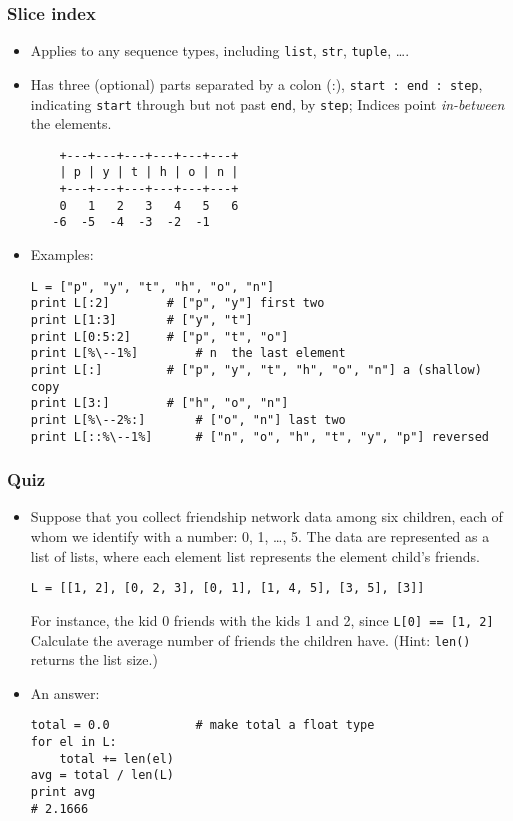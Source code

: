\documentclass{beamer}
\begin{document}
\begin{frame}[fragile]
\frametitle{Slice index}
\begin{itemize}
\item Applies to any sequence types, including
      \lstinline{list}, \lstinline{str},
      \lstinline{tuple}, \ldots.
\item Has three (optional) parts separated 
      by a colon (:),
      \lstinline{start : end : step}, indicating
      \lstinline{start} through but not past
      \lstinline{end}, by \lstinline{step}; Indices
      point \emph{in-between} the elements.
\begin{lstlisting}
    +---+---+---+---+---+---+
    | p | y | t | h | o | n |
    +---+---+---+---+---+---+
    0   1   2   3   4   5   6
   -6  -5  -4  -3  -2  -1
\end{lstlisting} 
\item Examples:
\begin{lstlisting}[escapechar=\%]
L = ["p", "y", "t", "h", "o", "n"]
print L[:2]        # ["p", "y"] first two
print L[1:3]       # ["y", "t"]
print L[0:5:2]     # ["p", "t", "o"]
print L[%\--1%]        # n  the last element
print L[:]         # ["p", "y", "t", "h", "o", "n"] a (shallow) copy
print L[3:]        # ["h", "o", "n"]
print L[%\--2%:]       # ["o", "n"] last two
print L[::%\--1%]      # ["n", "o", "h", "t", "y", "p"] reversed
\end{lstlisting}
\end{itemize}
\end{frame}

\begin{frame}[fragile]
\frametitle{Quiz}
\begin{itemize}
\item<1-> Suppose that you collect
      friendship network data among six children,
      each of whom we identify with a number: 0, 1,
      \ldots, 5.
      The data are represented as a list of lists,
      where each element list
      represents the element child's friends.
\begin{lstlisting}
L = [[1, 2], [0, 2, 3], [0, 1], [1, 4, 5], [3, 5], [3]]
\end{lstlisting}
      For instance, the kid 0 friends with
      the kids 1 and 2, since
      \lstinline{L[0] == [1, 2]}
      Calculate the average number of friends
      the children have. (Hint: \lstinline{len()}
      returns the list size.)
\item<2-> An answer:
\begin{lstlisting}
total = 0.0            # make total a float type
for el in L:
    total += len(el)
avg = total / len(L)
print avg
# 2.1666
\end{lstlisting}
\end{itemize}
\end{frame}
\end{document}
